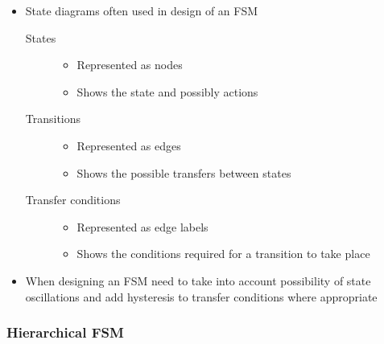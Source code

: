 \documentclass[a4paper]{article}
\begin{document}
\begin{itemize}
\begin{description}
\begin{itemize}
        \end{itemize}

    \end{description}

  \item
    State diagrams often used in design of an FSM

    \begin{description}
      \item[States] \hfill
        \begin{itemize}
          \item
            Represented as nodes

          \item
            Shows the state and possibly actions

        \end{itemize}

      \item[Transitions] \hfill
        \begin{itemize}
          \item
            Represented as edges

          \item
            Shows the possible transfers between states

        \end{itemize}

      \item[Transfer conditions] \hfill
        \begin{itemize}
          \item
            Represented as edge labels

          \item
            Shows the conditions required for a transition to take place

        \end{itemize}

    \end{description}

  \item
    When designing an FSM need to take into account possibility of state
    oscillations and add hysteresis to transfer conditions where appropriate

\end{itemize}

\subsubsection{Hierarchical FSM}
\end{document}
